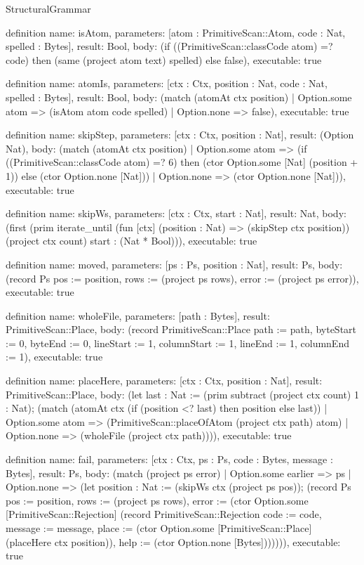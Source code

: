 \begin{lexlean}{StructuralGrammar}
\begin{semanticmodule}
definition{
  name: isAtom,
  parameters: [atom : PrimitiveScan::Atom, code : Nat, spelled : Bytes],
  result: Bool,
  body: (if ((PrimitiveScan::classCode atom) =? code) then (same (project atom text) spelled) else false),
  executable: true
}

definition{
  name: atomIs,
  parameters: [ctx : Ctx, position : Nat, code : Nat, spelled : Bytes],
  result: Bool,
  body: (match (atomAt ctx position)
    | Option.some atom => (isAtom atom code spelled)
    | Option.none => false),
  executable: true
}

definition{
  name: skipStep,
  parameters: [ctx : Ctx, position : Nat],
  result: (Option Nat),
  body: (match (atomAt ctx position)
    | Option.some atom => (if ((PrimitiveScan::classCode atom) =? 6) then (ctor Option.some [Nat] (position + 1)) else (ctor Option.none [Nat]))
    | Option.none => (ctor Option.none [Nat])),
  executable: true
}

definition{
  name: skipWs,
  parameters: [ctx : Ctx, start : Nat],
  result: Nat,
  body: (first (prim iterate_until (fun [ctx] (position : Nat) => (skipStep ctx position)) (project ctx count) start : (Nat * Bool))),
  executable: true
}

definition{
  name: moved,
  parameters: [ps : Ps, position : Nat],
  result: Ps,
  body: (record Ps {pos := position, rows := (project ps rows), error := (project ps error)}),
  executable: true
}

definition{
  name: wholeFile,
  parameters: [path : Bytes],
  result: PrimitiveScan::Place,
  body: (record PrimitiveScan::Place {path := path, byteStart := 0, byteEnd := 0, lineStart := 1, columnStart := 1, lineEnd := 1, columnEnd := 1}),
  executable: true
}

definition{
  name: placeHere,
  parameters: [ctx : Ctx, position : Nat],
  result: PrimitiveScan::Place,
  body: (let last : Nat := (prim subtract (project ctx count) 1 : Nat); (match (atomAt ctx (if (position <? last) then position else last))
    | Option.some atom => (PrimitiveScan::placeOfAtom (project ctx path) atom)
    | Option.none => (wholeFile (project ctx path)))),
  executable: true
}

definition{
  name: fail,
  parameters: [ctx : Ctx, ps : Ps, code : Bytes, message : Bytes],
  result: Ps,
  body: (match (project ps error)
    | Option.some earlier => ps
    | Option.none => (let position : Nat := (skipWs ctx (project ps pos)); (record Ps {pos := position, rows := (project ps rows), error := (ctor Option.some [PrimitiveScan::Rejection] (record PrimitiveScan::Rejection {code := code, message := message, place := (ctor Option.some [PrimitiveScan::Place] (placeHere ctx position)), help := (ctor Option.none [Bytes])}))}))),
  executable: true
}


\end{semanticmodule}
\end{lexlean}
